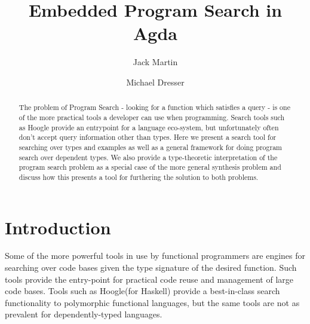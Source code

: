 \documentclass[acmsmall,review,authorversion]{acmart}
\newcommand{\?}{\stackrel{?}{\approx}}
\begin{document}
\title{Embedded Program Search in Agda}


\author{Jack Martin}
\author{Michael Dresser}


\begin{abstract}
The problem of Program Search - looking for a function which satisfies a query -
is one of the more practical tools a developer can use when programming. Search
tools such as Hoogle provide an entrypoint for a language eco-system, but
unfortunately often don't accept query information other than types. Here we
present a search tool for searching over types and examples as well as a general
framework for doing program search over dependent types. We also provide a
type-theoretic interpretation of the program search problem as a special case of
the more general synthesis problem and discuss how this presents a tool for
furthering the solution to both problems.
\end{abstract}

\maketitle

\section{Introduction}

Some of the more powerful tools in use by functional programmers are engines for
searching over code bases given the type signature of the desired function. Such
tools provide the entry-point for practical code reuse and management of large
code bases. Tools such as Hoogle(for Haskell)\cite{mitchell2008hoogle} provide a
best-in-class search functionality to polymorphic functional languages, but the
same tools are not as prevalent for dependently-typed languages.
\end{document}
